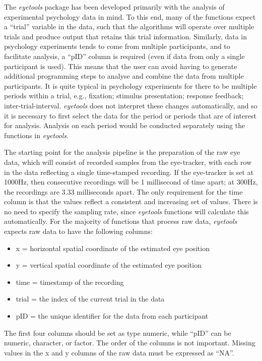 \documentclass[
  man,
  floatsintext,
  longtable,
  nolmodern,
  notxfonts,
  notimes,
  colorlinks=true,linkcolor=blue,citecolor=blue,urlcolor=blue]{apa7}
\begin{document}
The \emph{eyetools} package has been developed primarily with the
analysis of experimental psychology data in mind. To this end, many of
the functions expect a ``trial'' variable in the data, such that the
algorithms will operate over multiple trials and produce output that
retains this trial information. Similarly, data in psychology
experiments tends to come from multiple participants, and to facilitate
analysis, a ``pID'' column is required (even if data from only a single
participant is used). This means that the user can avoid having to
generate additional programming steps to analyse and combine the data
from multiple participants. It is quite typical in psychology
experiments for there to be multiple periods within a trial, e.g.,
fixation; stimulus presentation; response feedback;
inter-trial-interval. \emph{eyetools} does not interpret these changes
automatically, and so it is necessary to first select the data for the
period or periods that are of interest for analysis. Analysis on each
period would be conducted separately using the functions in
\emph{eyetools}.

The starting point for the analysis pipeline is the preparation of the
raw eye data, which will consist of recorded samples from the
eye-tracker, with each row in the data reflecting a single time-stamped
recording. If the eye-tracker is set at 1000Hz, then consecutive
recordings will be 1 millisecond of time apart; at 300Hz, the recordings
are 3.33 milliseconds apart. The only requirement for the time column is
that the values reflect a consistent and increasing set of values. There
is no need to specify the sampling rate, since \emph{eyetools} functions
will calculate this automatically. For the majority of functions that
process raw data, \emph{eyetools} expects raw data to have the following
columns:

\begin{itemize}
\item
  x = horizontal spatial coordinate of the estimated eye position
\item
  y = vertical spatial coordinate of the estimated eye position
\item
  time = timestamp of the recording
\item
  trial = the index of the current trial in the data
\item
  pID = the unique identifier for the data from each participant
\end{itemize}

The first four columns should be set as type numeric, while ``pID'' can
be numeric, character, or factor. The order of the columns is not
important. Missing values in the x and y columns of the raw data must be
expressed as ``NA''.
\end{document}
